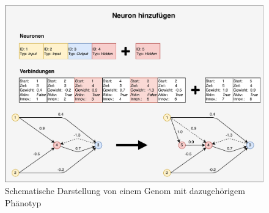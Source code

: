 \begin{figure}[!h]
	\centering
	\includegraphics[width=1\textwidth]{./img/neat-AddNodeMutation.pdf} 
	\caption{Schematische Darstellung von einem Genom mit dazugehörigem Phänotyp}
	\label{fig:neat_add_node_mutation}
\end{figure}
